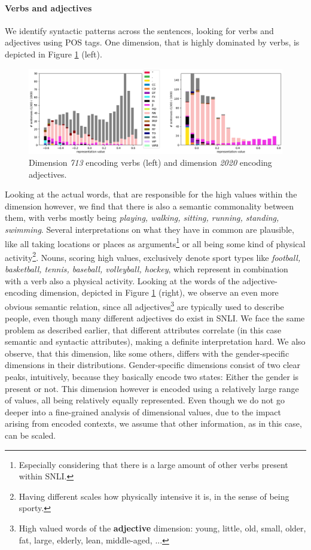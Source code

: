\paragraph*{Verbs and adjectives}
We identify syntactic patterns across the sentences, looking for verbs and adjectives using \ac{POS} tags. One dimension, that is highly dominated by verbs, is depicted in Figure \ref{fig:find_syntax_vb} (left).
\begin{figure}[tph!]
\centering
	\includegraphics[totalheight=6cm]{fig/find_syntax_vb.png}
	\caption{Dimension \textit{713} encoding verbs (left) and dimension \textit{2020} encoding adjectives.}
	\label{fig:find_syntax_vb}
\end{figure}
Looking at the actual words, that are responsible for the high values within the dimension however, we find that there is also a semantic commonality between them, with verbs mostly being \textit{playing, walking, sitting, running, standing, swimming}. Several interpretations on what they have in common are plausible, like all taking locations or places as arguments\footnote{Especially considering that there is a large amount of other verbs present within \ac{SNLI}.} or all being some kind of physical activity\footnote{Having different scales how physically intensive it is, in the sense of being sporty.}. Nouns, scoring high values, exclusively denote sport types like \textit{football, basketball, tennis, baseball, volleyball, hockey}, which represent in combination with a verb also a physical activity. Looking at the words of the adjective-encoding dimension, depicted in Figure \ref{fig:find_syntax_vb} (right), we observe an even more obvious semantic relation, since all adjectives\footnote{High valued words of the \textbf{adjective} dimension: young, little, old, small, older, fat, large, elderly, lean, middle-aged, ...} are typically used to describe people, even though many different adjectives do exist in \ac{SNLI}. We face the same problem as described earlier, that different attributes correlate (in this case semantic and syntactic attributes), making a definite interpretation hard. We also observe, that this dimension, like some others, differs with the gender-specific dimensions in their distributions. Gender-specific dimensions consist of two clear peaks, intuitively, because they basically encode two states: Either the gender is present or not. This dimension however is encoded using a relatively large range of values, all being relatively equally represented. Even though we do not go deeper into a fine-grained analysis of dimensional values, due to the impact arising from encoded contexts, we assume that other information, as in this case, can be scaled. 
